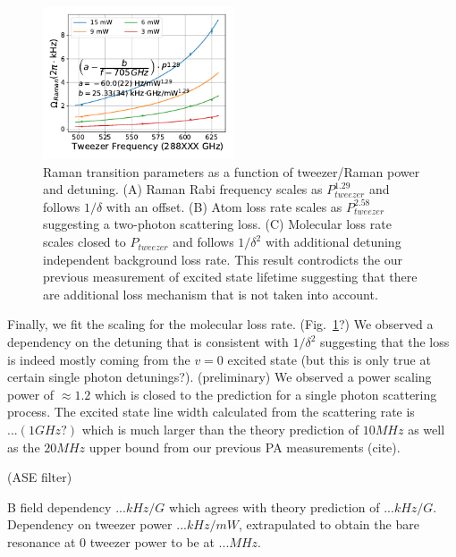\documentclass[aps,prl,twocolumn,groupedaddress]{revtex4-1}
\newcommand{\todo}[1]{}
\begin{document}
\begin{figure}
  \includegraphics[height=4.5cm]{fig4.pdf}
  \caption{Raman transition parameters as a function of tweezer/Raman power and detuning.
    (A) Raman Rabi frequency scales as $P_{tweezer}^{1.29}$ and follows $1/\delta$ with an offset.
    (B) Atom loss rate scales as $P_{tweezer}^{2.58}$ suggesting a two-photon scattering loss.
    (C) Molecular loss rate scales closed to $P_{tweezer}$ and follows $1/\delta^2$
    with additional detuning independent background loss rate.
    This result controdicts the our previous measurement of excited state lifetime
    suggesting that there are additional loss mechanism that is not taken into account.
    \label{f-det}}
\end{figure}

Finally, we fit the scaling for the molecular loss rate. (Fig.~\ref{f-det}?)
We observed a dependency on the detuning that is consistent with $1/\delta^2$ suggesting that the loss is indeed mostly coming from the $v=0$ excited state (but this is only true at certain single photon detunings?). (preliminary) We observed a power scaling power of $\approx1.2$ which is closed to the prediction for a single photon scattering process. The excited state line width calculated from the scattering rate is $...(1 GHz?)$ which is much larger than the theory prediction of $10 MHz$ as well as the $20 MHz$ upper bound from our previous PA measurements (cite).

(ASE filter)









B field dependency $... kHz/G$ which agrees with theory prediction of $... kHz/G$.
Dependency on tweezer power $... kHz/mW$, extrapulated to obtain the bare resonance at $0$ tweezer power to be at $... MHz$.

\todo{sm: STIRAP vs Raman}



\end{document}
